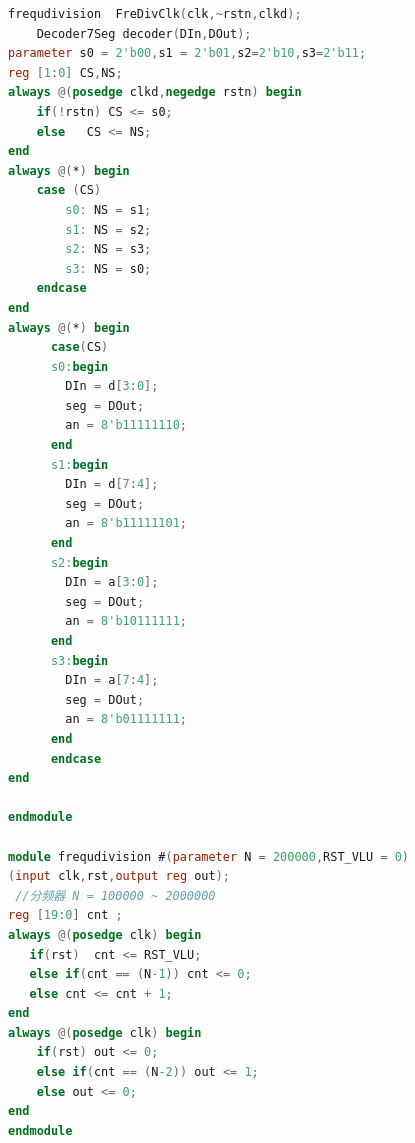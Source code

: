 \documentclass[UTF8,fontset=fandol]{ctexart}
\begin{document}
\begin{itemize}
\begin{itemize}
\begin{lstlisting}[language=Verilog,keywordstyle=\color{red!70}]
    frequdivision  FreDivClk(clk,~rstn,clkd);
    Decoder7Seg decoder(DIn,DOut);
parameter s0 = 2'b00,s1 = 2'b01,s2=2'b10,s3=2'b11;
reg [1:0] CS,NS;
always @(posedge clkd,negedge rstn) begin
    if(!rstn) CS <= s0;
    else   CS <= NS; 
end 
always @(*) begin
    case (CS)
        s0: NS = s1;
        s1: NS = s2;
        s2: NS = s3;
        s3: NS = s0;  
    endcase
end 
always @(*) begin
      case(CS)
      s0:begin
        DIn = d[3:0];
        seg = DOut;
        an = 8'b11111110;
      end
      s1:begin
        DIn = d[7:4];
        seg = DOut;
        an = 8'b11111101;
      end
      s2:begin
        DIn = a[3:0];
        seg = DOut;
        an = 8'b10111111;
      end
      s3:begin
        DIn = a[7:4];
        seg = DOut;
        an = 8'b01111111;
      end
      endcase
end

endmodule

module frequdivision #(parameter N = 200000,RST_VLU = 0)
(input clk,rst,output reg out); 
 //分频器 N = 100000 ~ 2000000
reg [19:0] cnt ;
always @(posedge clk) begin
   if(rst)  cnt <= RST_VLU;
   else if(cnt == (N-1)) cnt <= 0;
   else cnt <= cnt + 1;
end
always @(posedge clk) begin
    if(rst) out <= 0;
    else if(cnt == (N-2)) out <= 1;
    else out <= 0;
end
endmodule


\end{lstlisting}
\end{itemize}
\end{itemize}
\end{document}
